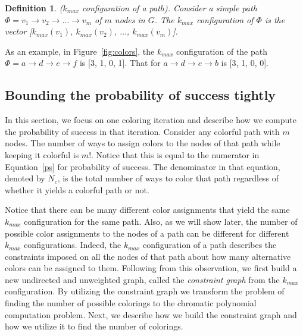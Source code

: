\documentclass{ws-procs11x85}
\newtheorem{define}{Definition}
\begin{document}
\begin{define} {\sc ($k_{max}$ configuration of a path)}.  Consider a
  simple path $\Phi = v_1 \rightarrow v_2 \rightarrow \ldots
  \rightarrow v_m$ of $m$ nodes in $G$. The $k_{max}$ configuration of
  $\Phi$ is the vector [$k_{max}(v_1)$, $k_{max}(v_2)$, $\ldots$,
  $k_{max}(v_m)$].
\end{define}

As an example, in Figure~\ref{fig:colors}, the $k_{max}$ configuration
of the path $\Phi = a \rightarrow d \rightarrow e \rightarrow f$ is
[3, 1, 0, 1]. That for $a \rightarrow d \rightarrow e \rightarrow b$ is
[3, 1, 0, 0].



\subsection{Bounding the probability of success tightly}
\label{sec:bound}



In this section, we focus on one coloring iteration and describe how
we compute the probability of success in that iteration.
Consider any colorful path with $m$ nodes. The number of ways to
assign colors to the nodes of that path while keeping it colorful is
$m!$. Notice that this is equal to the numerator in Equation~\ref{ps}
for probability of success. The denominator in that equation, denoted
by $N_c$, is the total number of ways to color that path regardless of
whether it yields a colorful path or not. 

Notice that there can be many different color assignments that yield
the same $k_{max}$ configuration for the same path. Also, as we will
show later, the number of possible color assignments to the nodes of a
path can be different for different $k_{max}$ configurations. Indeed,
the $k_{max}$ configuration of a path describes the constraints
imposed on all the nodes of that path about how many alternative
colors can be assigned to them.  Following from this observation, we
first build a new undirected and unweighted graph, called the {\em
  constraint graph} from the $k_{max}$ configuration. By utilizing the
constraint graph we transform the problem of finding the number of
possible colorings to the chromatic polynomial computation problem.
Next, we describe how we build the constraint graph and how we utilize it to find the number of colorings.
\end{document}
